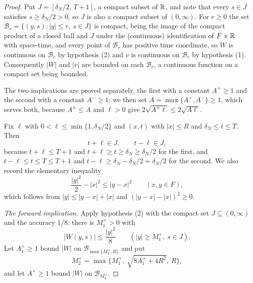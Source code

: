 \begin{proof}
Put $J=[\delta_N/2,\,T+1]$, a compact subset of $\mathbb{R}$, and note that every
$s\in J$ satisfies $s\ge\delta_N/2>0$, so $J$ is also a compact subset of
$(0,\infty)$. For $r\ge0$ the set
$\mathcal B_r=\{(y,s):|y|\le r,\ s\in J\}$ is compact, being the image of the
compact product of a closed ball and $J$ under the (continuous) identification of
$F\times\mathbb{R}$ with space-time, and every point of $\mathcal B_r$ has positive time
coordinate, so $W$ is continuous on $\mathcal B_r$ by hypothesis (2) and $v$ is
continuous on $\mathcal B_r$ by hypothesis (1). Consequently $|W|$ and $|v|$ are
bounded on each $\mathcal B_r$, a continuous function on a compact set being
bounded.

The two implications are proved separately, the first with a constant
$A^+\ge1$ and the second with a constant $A^-\ge1$; we then set
$A=\max\{A^+,A^-\}\ge1$, which serves both, because $A^\pm\le A$ and $\ell>0$
give $2\sqrt{A^\pm\ell}\le2\sqrt{A\ell}$.

Fix $\ell$ with $0<\ell\le\min\{1,\delta_N/2\}$ and $(x,t)$ with $|x|\le R$ and
$\delta_N\le t\le T$. Then
\begin{equation}\label{eq:ol-window}
  t+\ell\in J,\qquad t-\ell\in J,
\end{equation}
because $t+\ell\le T+1$ and $t+\ell\ge t\ge\delta_N\ge\delta_N/2$ for the first,
and $t-\ell\le t\le T\le T+1$ and $t-\ell\ge\delta_N-\delta_N/2=\delta_N/2$ for
the second. We also record the elementary inequality
\begin{equation}\label{eq:ol-quad}
  \frac{|y|^2}{2}-|x|^2\le|y-x|^2\qquad(x,y\in F),
\end{equation}
which follows from $|y|\le|y-x|+|x|$ and $(|y-x|-|x|)^2\ge0$.

\emph{The forward implication.}
Apply hypothesis (2) with the compact set $J\subseteq(0,\infty)$ and the accuracy
$1/8$: there is $M^+_1>0$ with
\begin{equation}\label{eq:ol-far}
  |W(y,s)|\le\frac{|y|^2}{8}\qquad(|y|\ge M^+_1,\ s\in J).
\end{equation}
Let $A^+_1\ge1$ bound $|W|$ on $\mathcal B_{\max\{M^+_1,R\}}$ and put
\[
  M^+_2=\max\bigl\{M^+_1,\ \sqrt{8A^+_1+4R^2},\ R\bigr\},
\]
and let $A^+\ge1$ bound $|W|$ on $\mathcal B_{M^+_2}$.


\end{proof}
